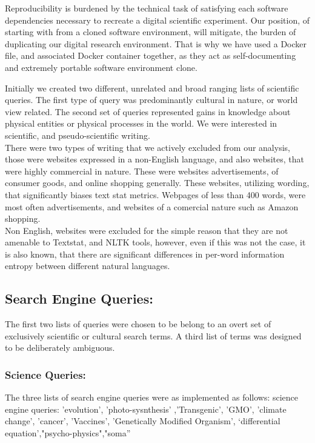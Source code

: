 \documentclass{clv3}
\begin{document}
Reproducibility is burdened by the technical task of satisfying each software dependencies necessary to recreate a digital scientific experiment. Our position, of starting with from a cloned software environment, will mitigate, the burden of duplicating our digital research environment. That is why we have used a Docker file, and associated Docker container together, as they act as self-documenting and extremely portable software environment clone.

Initially we created two different, unrelated and broad ranging lists of scientific queries. The first type of query was predominantly cultural in nature, or world view related. The second set of queries represented gains in knowledge about physical entities or physical processes in the world. We were interested in scientific, and pseudo-scientific writing.\\

There were two types of writing that we actively excluded from our analysis, those were websites expressed in a non-English language, and also websites, that were highly commercial in nature. These were websites advertisements, of consumer goods, and online shopping generally. These websites, utilizing wording, that significantly biases text stat metrics. Webpages of less than 400 words, were most often advertisements, and websites of a comercial nature such as Amazon shopping.\\

Non English, websites were excluded for the simple reason that they are not amenable to Textstat, and NLTK tools, however, even if this was not the case, it is also known, that there are  significant differences in per-word information entropy between different natural languages.

\subsection{Search Engine Queries:}
The first two lists of queries were chosen to be belong to an overt set of exclusively scientific or cultural search terms. A third list of terms was designed to be deliberately ambiguous.

\subsubsection{Science Queries:}
The three lists of search engine queries were as implemented as follows: science engine queries: 'evolution', 'photo-sysnthesis' ,'Transgenic', 'GMO', 'climate change', 'cancer', 'Vaccines', 'Genetically Modified Organism', ‘differential equation’,"psycho-physics","soma”
\end{document}
